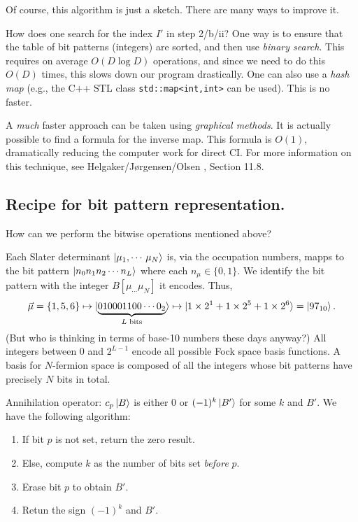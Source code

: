 \documentclass{report}
\theoremstyle{plain}
\theoremstyle{definition}
\begin{document}
Of course, this algorithm is just a sketch. There are many ways to
improve it.

How does one search for the index $I'$ in step 2/b/ii? One way is to
ensure that the table of bit patterns (integers) are sorted, and then
use \emph{binary search}. This requires on average $O(D \log D)$
operations, and since we need to do this $O(D)$ times, this slows down
our program drastically. One can also use a \emph{hash map} (e.g., the
C++ STL class \texttt{std::map<int,int>} can be used). This is no
faster.

A \emph{much} faster approach can be taken using \emph{graphical
  methods}. It is actually possible to find a formula for the inverse
map. This formula is $O(1)$, dramatically reducing the computer work
for direct CI. For more information on this technique, see
Helgaker/J{\o}rgensen/Olsen \cite{HJO}, Section 11.8. 


\subsection{Recipe for bit pattern representation.}

How can we perform the bitwise operations mentioned above?

Each Slater determinant $\ket{\mu_1,\cdots\,\mu_N}$ is, via the
occupation numbers, mapps to the bit pattern $\ket{n_0 n_1 n_2\cdots n_L}$ where each
$n_\mu \in \{0,1\}$. We identify the bit pattern with the integer
$B[\mu_\cdots \mu_N]$ it encodes. Thus,
\begin{equation}
  \vec{\mu} = \{1, 5, 6\} \mapsto \ket{\underbrace{010001100\cdots
      0_2}_{\text{$L$ bits}}} \mapsto \ket{ 1\times 2^1 + 1\times 2^5 +
    1\times 2^6} = \ket{ 97_{10}}.
\end{equation}
(But who is thinking in terms of base-10 numbers these days anyway?)
All integers between 0 and $2^{L-1}$ encode all possible Fock space
basis functions. A basis for $N$-fermion space is composed of all the
integers whose bit patterns have precisely $N$ bits in total.

Annihilation operator: $c_p \ket{B}$ is either $0$ or
$(-1)^k\ket{B'}$ for some $k$ and $B'$. We have the
following algorithm:
\begin{enumerate}
\item
  If bit $p$ is not set, return the zero result.
\item
  Else, compute $k$ as the number of bits set \emph{before} $p$.
\item
  Erase bit $p$  to obtain $B'$.
\item
  Retun the sign $(-1)^k$ and $B'$.
\end{enumerate}
\end{document}
